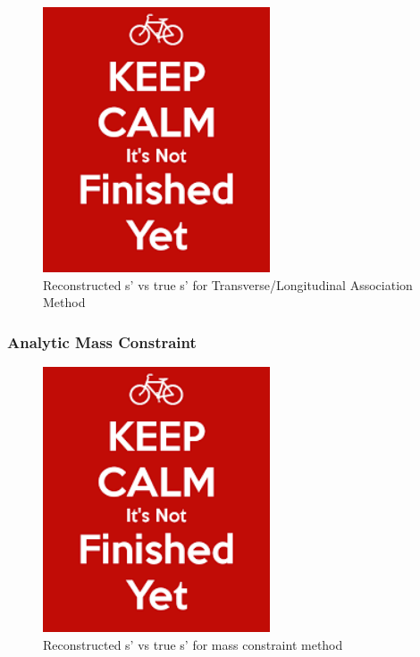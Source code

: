 \begin{figure}
  \centering
  \includegraphics[width=0.6\textwidth]{TopAnalysis/figures/dummy}
  \caption[Reconstructed s' vs true s' for Transverse/Longitudinal Association Method]{Reconstructed s' vs true s' for Transverse/Longitudinal Association Method}
  \label{fig:simpleAssoication}
\end{figure}

\subsubsection{Analytic Mass Constraint}

\begin{figure}
  \centering
  \includegraphics[width=0.6\textwidth]{TopAnalysis/figures/dummy}
  \caption[Reconstructed s' vs true s' for mass constraint method]{Reconstructed s' vs true s' for mass constraint method}
  \label{fig:MassConstraint}
\end{figure}

